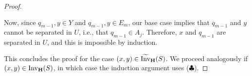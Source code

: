 \documentclass[10pt,a4paper]{amsart}
\newcommand{\Invt}{\widetilde{\mathrm{Inv}}}
\newcommand{\Inv}{{\mathrm{Inv}}}
\begin{document}
\begin{proof}
\begin{itemize}
Now, since $q_{m-1},y\in Y$ and $q_{m-1},y\in E_m$, our base case implies that $q_{m-1}$ and $y$ cannot be separated in $U$, i.e., that $q_{m-1}\in A_j$. Therefore, $x$ and $q_{m-1}$ are separated in $U$, and this is impossible by induction.
\end{itemize}
This concludes the proof for the case $(x,y)\in \Invt_{\bf H}(S)$. We proceed analogously if $(x,y)\in \Inv_{\bf H}(S)$, in which case the induction argument uses ($\clubsuit$).
 \end{proof}
\end{document}
